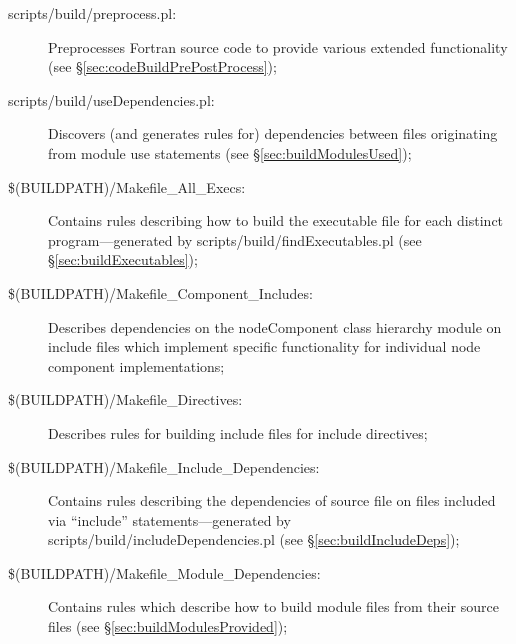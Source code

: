 \begin{description}
\item[{\normalfont \ttfamily scripts/build/preprocess.pl}:] Preprocesses Fortran source code to provide various extended functionality (see \S\ref{sec:codeBuildPrePostProcess});

\item[{\normalfont \ttfamily scripts/build/useDependencies.pl}:] Discovers (and generates rules for) dependencies between files originating from module {\normalfont \ttfamily use} statements (see \S\ref{sec:buildModulesUsed});
  
\item[{\normalfont \ttfamily \$(BUILDPATH)/Makefile\_All\_Execs}:] Contains rules describing how to build the executable file for each distinct program---generated by {\normalfont \ttfamily scripts/build/findExecutables.pl} (see \S\ref{sec:buildExecutables});

\item[{\normalfont \ttfamily \$(BUILDPATH)/Makefile\_Component\_Includes}:] Describes dependencies on the {\normalfont \ttfamily nodeComponent} class hierarchy module on include files which implement specific functionality for individual node component implementations;
  
\item[{\normalfont \ttfamily \$(BUILDPATH)/Makefile\_Directives}:] Describes rules for building include files for {\normalfont \ttfamily include} directives;

\item[{\normalfont \ttfamily \$(BUILDPATH)/Makefile\_Include\_Dependencies}:] Contains rules describing the dependencies of source file on files included via ``{\normalfont \ttfamily include}'' statements---generated by {\normalfont \ttfamily scripts/build/includeDependencies.pl} (see \S\ref{sec:buildIncludeDeps});

\item[{\normalfont \ttfamily \$(BUILDPATH)/Makefile\_Module\_Dependencies}:] Contains rules which describe how to build module files from their source files (see \S\ref{sec:buildModulesProvided});


\end{description}
